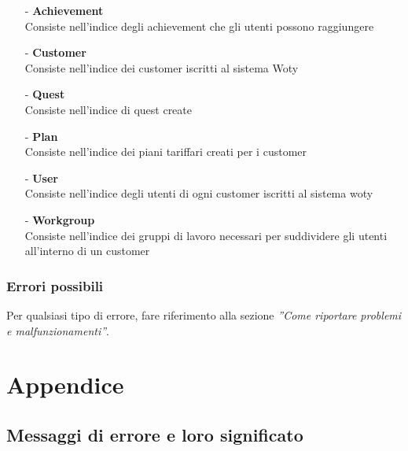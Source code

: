 \begin{itemize}
\item[-] \textbf{Achievement}\\
Consiste nell'indice degli achievement che gli utenti possono raggiungere

\item[-] \textbf{Customer}\\
Consiste nell'indice dei customer iscritti al sistema Woty

\item[-] \textbf{Quest}\\
Consiste nell'indice di quest create

\item[-] \textbf{Plan}\\
Consiste nell'indice dei piani tariffari creati per i customer

\item[-] \textbf{User}\\
Consiste nell'indice degli utenti di ogni customer iscritti al sistema woty

\item[-] \textbf{Workgroup}\\
Consiste nell'indice dei gruppi di lavoro necessari per suddividere gli utenti all'interno di un customer


\end{itemize}




\subsubsection{Errori possibili}
Per qualsiasi tipo di errore, fare riferimento alla sezione \emph{''Come riportare problemi e malfunzionamenti''}.



\newpage

\section{Appendice}


\subsection{Messaggi di errore e loro significato}

